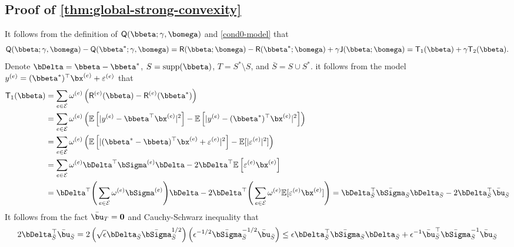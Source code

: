 \documentclass[10pt]{article}
\numberwithin{equation}{section}
\newcommand*{\supp}{\mathrm{supp}}
\begin{document}
\subsection{Proof of \cref{thm:global-strong-convexity}}

It follows from the definition of $\mathsf{Q}(\bbeta; \gamma, \bomega)$ and \cref{cond0-model} that
\begin{align*}
	\mathsf{Q}(\bbeta; \gamma,\bomega) - \mathsf{Q}(\bbeta^*;\gamma, \bomega) = \mathsf{R}(\bbeta;\bomega) - \mathsf{R}(\bbeta^*; \bomega) + \gamma \mathsf{J}(\bbeta; \bomega) = \mathsf{T}_1(\bbeta) + \gamma \mathsf{T}_2(\bbeta).
\end{align*}
Denote $\bDelta = \bbeta - \bbeta^*$, $S=\supp(\bbeta)$, $T=S^*\setminus S$, and $\bar{S} = S\cup S^*$. it follows from the model $y^{(e)} = (\bbeta^*)^\top \bx^{(e)} + \varepsilon^{(e)}$ that
\begin{align*}
	\mathsf{T}_1(\bbeta) &= \sum_{e\in \mathcal{E}} \omega^{(e)} \left(\mathsf{R}^{(e)}(\bbeta) - \mathsf{R}^{(e)}(\bbeta^*)\right) \\
	&= \sum_{e\in \mathcal{E}} \omega^{(e)} \left(\mathbb{E} \left[|y^{(e)} - \bbeta^\top \bx^{(e)}|^2 \right]- \mathbb{E} \left[|y^{(e)} - (\bbeta^*)^\top \bx^{(e)}|^2 \right]\right) \\
	&= \sum_{e\in \mathcal{E}} \omega^{(e)} \left(\mathbb{E} \left[|(\bbeta^* - \bbeta)^\top \bx^{(e)} + \varepsilon^{(e)} |^2\right] - \mathbb{E}[|\varepsilon^{(e)}|^2 ]\right) \\
	&= \sum_{e\in \mathcal{E}} \omega^{(e)} \bDelta^\top \bSigma^{(e)} \bDelta - 2\bDelta^\top \mathbb{E}\left[\varepsilon^{(e)} \bx^{(e)} \right] \\
	&= \bDelta^\top \Bigg(\sum_{e\in \mathcal{E}} \omega^{(e)} \bSigma^{(e)} \Bigg) \bDelta - 2\bDelta^\top \Bigg(\sum_{e\in \mathcal{E}} \omega^{(e)} \mathbb{E}[\varepsilon^{(e)} \bx^{(e)}] \Bigg) = \bDelta_{\bar{S}}^\top \bar{\bSigma}_{\bar{S}} \bDelta_{\bar{S}} - 2 \bDelta^\top_{\bar{S}} \bar{\bu}_{\bar{S}}
\end{align*} 
It follows from the fact $\bar{\bu}_T=\bm{0}$ and Cauchy-Schwarz inequality that
\begin{align}
\label{eq:proof-thm1-eq1}
	2\bDelta^\top_{\bar{S}} \bar{\bu}_{\bar{S}} = 2\left(\sqrt{\epsilon} \bDelta_{\bar{S}} \bar{\bSigma}_{\bar{S}}^{1/2} \right) \left(\epsilon^{-1/2} \bar{\bSigma}_{\bar{S}}^{-1/2} \bar{\bu}_{\bar{S}} \right) \le \epsilon \bDelta_{\bar{S}}^\top \bar{\bSigma}_{\bar{S}} \bDelta_{\bar{S}} + \epsilon^{-1} \bar{\bu}_{\bar{S}}^\top \bar{\bSigma}_{\bar{S}}^{-1} \bar{\bu}_{\bar{S}}
\end{align}
\end{document}

